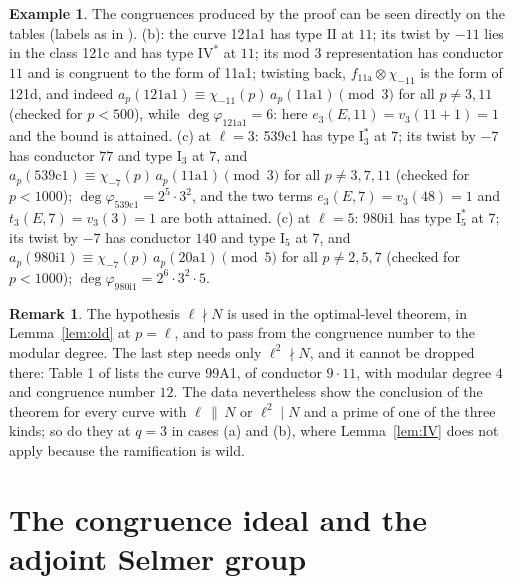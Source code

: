 \documentclass[11pt]{amsart}
\theoremstyle{definition}
\newtheorem{remark}[theorem]{Remark}
\newtheorem{example}[theorem]{Example}
\begin{document}
\begin{example}
The congruences produced by the proof can be seen directly on the tables (labels as in \cite{Cremona97}). (b): the curve 121a1 has type $\mathrm{II}$ at $11$; its twist by $-11$ lies in the class 121c and has type $\mathrm{IV}^*$ at $11$; its mod $3$ representation has conductor $11$ and is congruent to the form of 11a1; twisting back, $f_{\text{11a}}\otimes\chi_{-11}$ is the form of 121d, and indeed $a_p(\text{121a1})\equiv\chi_{-11}(p)\,a_p(\text{11a1})\pmod 3$ for all $p\ne3,11$ (checked for $p<500$), while $\deg\varphi_{\text{121a1}}=6$: here $e_3(E,11)=v_3(11+1)=1$ and the bound is attained. (c) at $\ell=3$: 539c1 has type $\mathrm{I}_3^*$ at $7$; its twist by $-7$ has conductor $77$ and type $\mathrm{I}_3$ at $7$, and $a_p(\text{539c1})\equiv\chi_{-7}(p)\,a_p(\text{11a1})\pmod3$ for all $p\ne3,7,11$ (checked for $p<1000$); $\deg\varphi_{\text{539c1}}=2^5\cdot3^2$, and the two terms $e_3(E,7)=v_3(48)=1$ and $t_3(E,7)=v_3(3)=1$ are both attained. (c) at $\ell=5$: 980i1 has type $\mathrm{I}_5^*$ at $7$; its twist by $-7$ has conductor $140$ and type $\mathrm{I}_5$ at $7$, and $a_p(\text{980i1})\equiv\chi_{-7}(p)\,a_p(\text{20a1})\pmod5$ for all $p\ne2,5,7$ (checked for $p<1000$); $\deg\varphi_{\text{980i1}}=2^6\cdot3^2\cdot5$.
\end{example}

\begin{remark}
The hypothesis $\ell\nmid N$ is used in the optimal-level theorem, in Lemma~\ref{lem:old} at $p=\ell$, and to pass from the congruence number to the modular degree. The last step needs only $\ell^2\nmid N$, and it cannot be dropped there: Table 1 of \cite{ARS12} lists the curve 99A1, of conductor $9\cdot11$, with modular degree $4$ and congruence number $12$. The data nevertheless show the conclusion of the theorem for every curve with $\ell\,\|\,N$ or $\ell^2\mid N$ and a prime of one of the three kinds; so do they at $q=3$ in cases (a) and (b), where Lemma~\ref{lem:IV} does not apply because the ramification is wild.
\end{remark}

\section{The congruence ideal and the adjoint Selmer group}\label{sec:quant}
\end{document}
